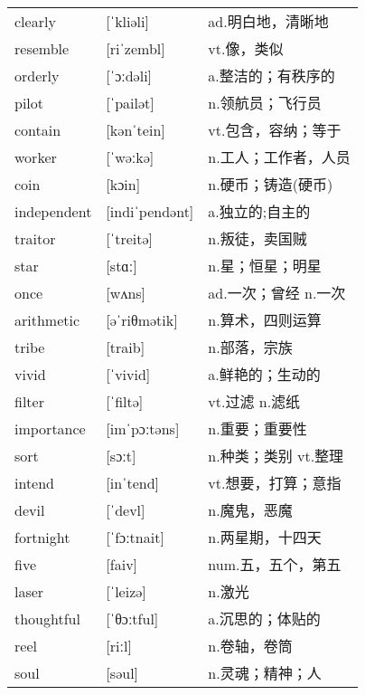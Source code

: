 \documentclass[a4paper]{article}
\begin{document}
\section{}
\begin{tabular}{l l l}

clearly & [ˈkliəli] & ad.明白地，清晰地 \\
resemble & [riˈzembl] & vt.像，类似 \\
orderly & [ˈɔːdəli] & a.整洁的；有秩序的 \\
pilot & [ˈpailət] & n.领航员；飞行员 \\
contain & [kənˈtein] & vt.包含，容纳；等于 \\
worker & [ˈwəːkə] & n.工人；工作者，人员 \\
coin & [kɔin] & n.硬币；铸造(硬币) \\
independent & [indiˈpendənt] & a.独立的;自主的 \\
traitor & [ˈtreitə] & n.叛徒，卖国贼 \\
star & [stɑː] & n.星；恒星；明星 \\
once & [wʌns] & ad.一次；曾经 n.一次 \\
arithmetic & [əˈriθmətik] & n.算术，四则运算 \\
tribe & [traib] & n.部落，宗族 \\
vivid & [ˈvivid] & a.鲜艳的；生动的 \\
filter & [ˈfiltə] & vt.过滤 n.滤纸 \\
importance & [imˈpɔːtəns] & n.重要；重要性 \\
sort & [sɔːt] & n.种类；类别 vt.整理 \\
intend & [inˈtend] & vt.想要，打算；意指 \\
devil & [ˈdevl] & n.魔鬼，恶魔 \\
fortnight & [ˈfɔːtnait] & n.两星期，十四天 \\
five & [faiv] & num.五，五个，第五 \\
laser & [ˈleizə] & n.激光 \\
thoughtful & [ˈθɔːtful] & a.沉思的；体贴的 \\
reel & [riːl] & n.卷轴，卷筒 \\
soul & [səul] & n.灵魂；精神；人 \\

\end{tabular}
\end{document}

